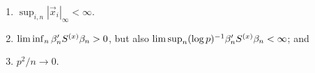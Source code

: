 \documentclass{article}
\newcounter{saveenumi}
\newcommand{\seti}{\setcounter{saveenumi}{\value{enumi}}}
\theoremstyle{remark}
\begin{document}
\begin{enumerate}
\item \label{A-boundedXes} $\sup_{i,n}|\vec{x}_{i}|_{\infty}   <\infty$. 
\item\label{A-PSvar}  $\lim\inf_{n}\beta_{n }'S^{(x)}\beta_{n } >0$,  but also $\lim\sup_{n} (\log p)^{-1}\beta_{n }'S^{(x)}\beta_{n }  < \infty$; and
\item \label{A-rates} $p^{2}/n \rightarrow 0$.
%
\seti
\end{enumerate}
\end{document}
